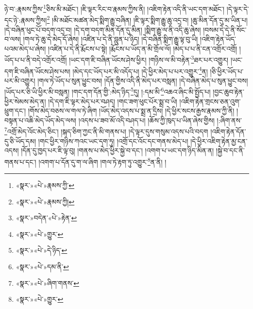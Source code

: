 \documentclass[12pt,a4paper]{book}
\begin{document}
ཉེ་བ་:རྣམས་ཀྱིས་\footnote{«སྣར་»«པེ་»རྣམས་ཀྱི་}ཅིས་མི་མཐོང་། །ཇི་ལྟར་རིང་བ་རྣམས་ཀྱིས་ནི། །འཇིག་རྟེན་འདི་ནི་ཡང་དག་མཐོང་། །དེ་ལྟར་དེ་དང་ཉེ་:རྣམས་ཀྱིས།\footnote{«སྣར་»«པེ་»རྣམས་ཀྱི།} །མི་མཐོང་མཚན་མེད་སྨིག་རྒྱུ་བཞིན། །ཇི་ལྟར་སྨིག་རྒྱུ་ཆུ་འདྲ་བ། །ཆུ་མིན་དོན་དུ་མ་ཡིན་པ། །དེ་བཞིན་ཕུང་པོ་བདག་འདྲ་བ། །དེ་དག་བདག་མིན་དོན་དུ་མིན། །སྨིག་རྒྱུ་ལ་ནི་འདི་ཆུ་ཞེས། །བསམ་དེ་དེ་ནི་སོང་བ་ལས། །གལ་ཏེ་ཆུ་དེ་མེད་དོ་ཞེས། །འཛིན་པ་དེ་ནི་བླུན་པ་ཉིད། །དེ་བཞིན་སྨིག་རྒྱུ་ལྟ་བུ་ཡི། །འཇིག་རྟེན་ཡོད་པའམ་མེད་པ་ཞེས། །འཛིན་པ་དེ་ནི་རྨོངས་པ་སྟེ། །རྨོངས་པ་ཡོད་ན་མི་གྲོལ་ལོ། །མེད་པ་པ་ནི་ངན་འགྲོར་འགྲོ། །ཡོད་པ་པ་ནི་བདེ་འགྲོར་འགྲོ། །ཡང་དག་ཇི་བཞིན་ཡོངས་ཤེས་ཕྱིར། །གཉིས་ལ་མི་བརྟེན་\footnote{«སྣར་»བདེན་«པེ་»རྟེན་}ཐར་པར་འགྱུར། །ཡང་དག་ཇི་བཞིན་ཡོངས་ཤེས་པས། །མེད་དང་ཡོད་པར་མི་འདོད་པ། །དེ་ཕྱིར་མེད་པ་པར་འགྱུར་\footnote{«སྣར་»«པེ་»གྱུར་}ན། །ཅི་ཕྱིར་ཡོད་པ་པར་མི་འགྱུར། །གལ་ཏེ་ཡོད་པ་སུན་ཕྱུང་བས། །དོན་གྱིས་འདི་ནི་མེད་པར་བསླན། །དེ་བཞིན་མེད་པ་སུན་ཕྱུང་བས། །ཡོད་པར་ཅི་ཡི་ཕྱིར་མི་བསླན། །གང་དག་དོན་གྱི་:མེད་ཉིད་\footnote{«སྣར་»«པེ་»དེ་ཉིད་}དུ། །:དམ་མི་\footnote{«སྣར་»«པེ་»དམ་ནི་}འཆའ་ཞིང་མི་སྤྱོད་པ། །བྱང་ཆུབ་རྟེན་ཕྱིར་སེམས་མེད་ན། །དེ་དག་ཇི་ལྟར་མེད་པར་བཤད། །གང་ཟག་ཕུང་པོར་སྨྲ་བ་ཡི། །འཇིག་རྟེན་གྲངས་ཅན་འུག་ཕྲུག་དང་། །གོས་མེད་བཅས་ལ་གལ་ཏེ་ཞིག །ཡོད་མེད་འདས་པ་སྨྲ་ན་དྲིས། །དེ་ཕྱིར་སངས་རྒྱས་རྣམས་ཀྱི་ནི། །བསྟན་པ་འཆི་མེད་ཡོད་མེད་ལས། །འདས་པ་ཟབ་མོ་འདི་བཤད་པ། །ཆོས་ཀྱི་ཁུད་པ་ཡིན་ཞེས་གྱིས། །:ཞིག་ནས་\footnote{«སྣར་»«པེ་»ཞིག་གནས་}འགྲོ་མེད་འོང་མེད་ཅིང་། །སྐད་ཅིག་ཀྱང་ནི་མི་གནས་པ། །དེ་ལྟར་དུས་གསུམ་འདས་པའི་བདག །འཇིག་རྟེན་དོན་དུ་ཅི་ཡོད་དམ། །གང་ཕྱིར་གཉིས་ཀའང་ཡང་དག་ཏུ། །འགྲོ་དང་འོང་དང་གནས་མེད་པ། །དེ་ཕྱིར་འཇིག་རྟེན་མྱ་ངན་འདས། །དོན་དུ་ཁྱད་པར་ཇི་ལྟ་བུ། །གནས་པ་མེད་ཕྱིར་སྐྱེ་བ་དང་། །འགག་པ་ཡང་དག་ཉིད་མིན་ན། །སྐྱེ་བ་དང་ནི་གནས་པ་དང་། །འགག་པ་དོན་དུ་ག་ལ་ཞིག །གལ་ཏེ་རྟག་ཏུ་འགྱུར་\footnote{«སྣར་»«པེ་»གྱུར་}ན་ནི། །
\end{document}
